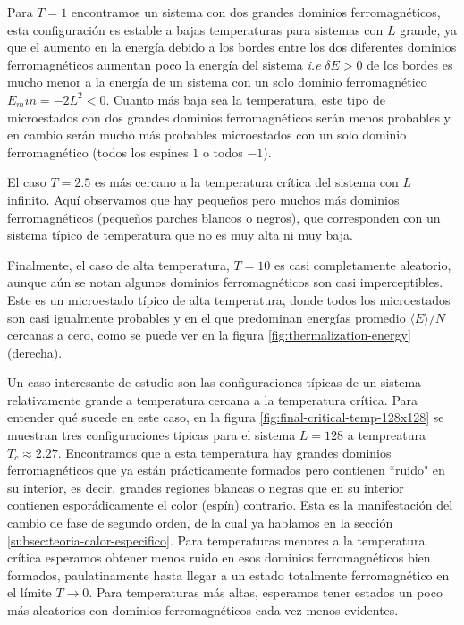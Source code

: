 \documentclass[%
 reprint,
 amsmath,amssymb,
 aps,
 pra,
]{revtex4-2}
\begin{document}
	Para $T=1$ encontramos un sistema con dos grandes dominios ferromagnéticos, esta configuración es estable a bajas temperaturas para sistemas con $L$ grande, ya que el aumento en la energía debido a los bordes entre los dos diferentes dominios ferromagnéticos aumentan poco la energía del sistema \textit{i.e} $\delta E>0$ de los bordes es mucho menor a la energía de un sistema con un solo dominio ferromagnético $E_min=-2L^2<0$. Cuanto más baja sea la temperatura, este tipo de microestados con dos grandes dominios ferromagnéticos serán menos probables y en cambio serán mucho más probables microestados con un solo dominio ferromagnético (todos los espines $1$ o todos $-1$).

	El caso $T=2.5$ es más cercano a la temperatura crítica del sistema con $L$ infinito. Aquí observamos que hay pequeños pero muchos más dominios ferromagnéticos (pequeños parches blancos o negros), que corresponden con un sistema típico de temperatura que no es muy alta ni muy baja. 

	Finalmente, el caso de alta temperatura, $T=10$ es casi completamente aleatorio, aunque aún se notan algunos dominios ferromagnéticos son casi imperceptibles. Este es un microestado típico de alta temperatura, donde todos los microestados son casi igualmente probables y en el que predominan energías promedio $\langle E \rangle / N$ cercanas a cero, como se puede ver en la figura \ref{fig:thermalization-energy} (derecha). 

	Un caso interesante de estudio son las configuraciones típicas de un sistema relativamente grande a temperatura cercana a la temperatura crítica. Para entender qué sucede en este caso, en la figura \ref{fig:final-critical-temp-128x128} se muestran tres configuraciones típicas para el sistema $L=128$ a tempreatura $T_c \approx 2.27$. Encontramos que a esta temperatura hay grandes dominios ferromagnéticos que ya están prácticamente formados pero contienen ``ruido" en su interior, es decir, grandes regiones blancas o negras que en su interior contienen esporádicamente el color (espín) contrario. Esta es la manifestación del cambio de fase de segundo orden, de la cual ya hablamos en la sección \ref{subsec:teoria-calor-especifico}. Para temperaturas menores a la temperatura crítica esperamos obtener menos ruido en esos dominios ferromagnéticos bien formados, paulatinamente hasta llegar a un estado totalmente ferromagnético en el límite $T \rightarrow 0$. Para temperaturas más altas, esperamos tener estados un poco más aleatorios con dominios ferromagnéticos cada vez menos evidentes. 
\end{document}
